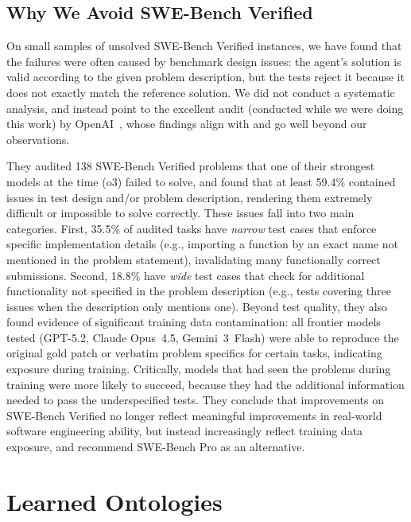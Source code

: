 \subsection{Why We Avoid SWE-Bench Verified}
\label{sec:app_swebench_verified}

On small samples of unsolved SWE-Bench Verified instances, we have found that the failures were often caused by benchmark design issues: the agent's solution is valid according to the given problem description, but the tests reject it because it does not exactly match the reference solution. We did not conduct a systematic analysis, and instead point to the excellent audit (conducted while we were doing this work) by OpenAI~\cite{openai2026_swebench_verified_audit}, whose findings align with and go well beyond our observations.

They audited 138 SWE-Bench Verified problems that one of their strongest models at the time (o3) failed to solve, and found that at least 59.4\% contained issues in test design and/or problem description, rendering them extremely difficult or impossible to solve correctly. These issues fall into two main categories. First, 35.5\% of audited tasks have \emph{narrow} test cases that enforce specific implementation details (e.g., importing a function by an exact name not mentioned in the problem statement), invalidating many functionally correct submissions. Second, 18.8\% have \emph{wide} test cases that check for additional functionality not specified in the problem description (e.g., tests covering three issues when the description only mentions one). Beyond test quality, they also found evidence of significant training data contamination: all frontier models tested (GPT-5.2, Claude Opus~4.5, Gemini~3~Flash) were able to reproduce the original gold patch or verbatim problem specifics for certain tasks, indicating exposure during training. Critically, models that had seen the problems during training were more likely to succeed, because they had the additional information needed to pass the underspecified tests. They conclude that improvements on SWE-Bench Verified no longer reflect meaningful improvements in real-world software engineering ability, but instead increasingly reflect training data exposure, and recommend SWE-Bench Pro as an alternative.


\section{Learned Ontologies}
\label{sec:app_design_docs}

